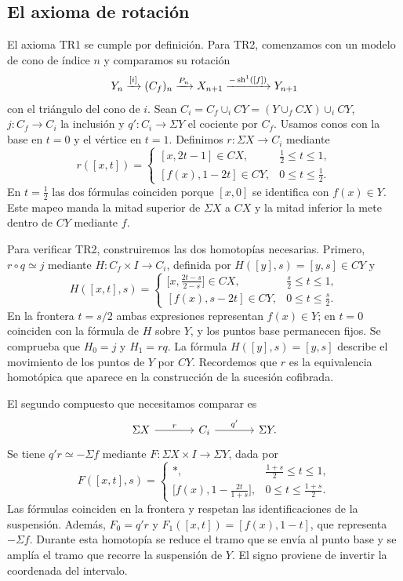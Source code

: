 \subsection{El axioma de rotación}
El axioma \textup{TR1} se cumple por definición. Para \textup{TR2}, comenzamos con un modelo de cono de índice $n$ y comparamos su rotación
\[
Y_n\xrightarrow{[i]}(C_f)_n\xrightarrow{P_n}X_{n+1}
\xrightarrow{-\operatorname{sh}^1([f])}Y_{n+1}
\]
con el triángulo del cono de $i$. Sean $C_i=C_f\cup_i CY=(Y\cup_f CX)\cup_i CY$, $j\colon C_f\to C_i$ la inclusión y $q'\colon C_i\to\Sigma Y$ el cociente por $C_f$. Usamos conos con la base en $t=0$ y el vértice en $t=1$. Definimos $r\colon\Sigma X\to C_i$ mediante
\[
r([x,t])=
\begin{cases}
[x,2t-1]\in CX,&\frac12\leq t\leq1,\\
[f(x),1-2t]\in CY,&0\leq t\leq\frac12.
\end{cases}
\]
En $t=\frac12$ las dos fórmulas coinciden porque $[x,0]$ se identifica con $f(x)\in Y$. Este mapeo manda la mitad superior de $\Sigma X$ a $CX$ y la mitad inferior la mete dentro de $CY$ mediante $f$.


Para verificar TR2, construiremos las dos homotopías necesarias. Primero, $r\circ q\simeq j$ mediante $H\colon C_f\times I\to C_i$, definida por $H([y],s)=[y,s]\in CY$ y
\[
H([x,t],s)=
\begin{cases}
\bigl[x,\frac{2t-s}{2-s}\bigr]\in CX,&\frac{s}{2}\leq t\leq1,\\[3pt]
[f(x),s-2t]\in CY,&0\leq t\leq\frac{s}{2}.
\end{cases}
\]
En la frontera $t=s/2$ ambas expresiones representan $f(x)\in Y$; en $t=0$ coinciden con la fórmula de $H$ sobre $Y$, y los puntos base permanecen fijos. Se comprueba que $H_0=j$ y $H_1=rq$. La fórmula $H([y],s)=[y,s]$ describe el movimiento de los puntos de $Y$ por $CY$.
Recordemos que $r$ es la equivalencia homotópica que aparece en la construcción de la sucesión cofibrada.

El segundo compuesto que necesitamos comparar es
\[
\begin{tikzcd}[column sep=large]
\Sigma X \arrow[r,"r"] & C_i \arrow[r,"q'"] & \Sigma Y.
\end{tikzcd}
\]
Se tiene $q'r\simeq-\Sigma f$ mediante $F\colon\Sigma X\times I\to\Sigma Y$, dada por
\[
F([x,t],s)=
\begin{cases}
*,&\frac{1+s}{2}\leq t\leq1,\\[3pt]
\bigl[f(x),1-\frac{2t}{1+s}\bigr],&0\leq t\leq\frac{1+s}{2}.
\end{cases}
\]
Las fórmulas coinciden en la frontera y respetan las identificaciones de la suspensión. Además, $F_0=q'r$ y $F_1([x,t])=[f(x),1-t]$, que representa $-\Sigma f$. Durante esta homotopía se reduce el tramo que se envía al punto base y se amplía el tramo que recorre la suspensión de $Y$. El signo proviene de invertir la coordenada del intervalo.

